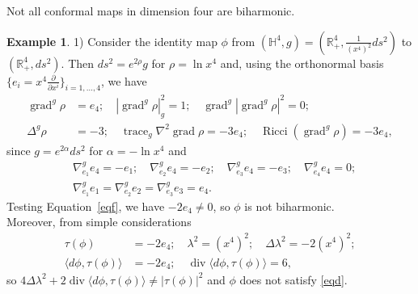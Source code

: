 \documentclass[12pt]{amsart}
\theoremstyle{plain}
\theoremstyle{definition}
\newtheorem{ex}{Example}
\begin{document}
Not all conformal maps in dimension four are biharmonic.
\begin{ex}
1) Consider the identity map $\phi$ from $({{\mathbb H}}^4 , g)=
({{\mathbb R}}_{+}^{4},\tfrac{1}{(x^4)^2}ds^2)$ to $({{\mathbb R}}^{4}_{+},ds^2)$. Then $ds^2 = e^{2\rho} g$
for $\rho = \ln x^4$ and, using the orthonormal basis $\{e_{i} = x^4
\tfrac{\partial}{\partial x^i}\}_{i=1,\dots,4}$, we have
\begin{align*}
\operatorname{grad}^g \rho &= e_4 ; \quad |\operatorname{grad}^g \rho|_{g}^2 = 1 ; \quad \operatorname{grad}^g|\operatorname{grad}^g \rho|^2 = 0 ;\\
\Delta^g \rho & = -3 ; \quad \operatorname{trace}_{g} \nabla^2 \operatorname{grad} \rho = -3 e_{4}; \quad \operatorname{Ricci}(\operatorname{grad}^g \rho)  = -3 e_4,
\end{align*}
since $g= e^{2\alpha} ds^2$ for $\alpha = - \ln x^4$ and
\begin{align*}
&\nabla^{g}_{e_{1}} e_{4} = - e_{1} ; \quad \nabla^{g}_{e_{2}} e_{4} = - e_{2} ;\quad
\nabla^{g}_{e_{3}} e_{4} = - e_{3} ; \quad \nabla^{g}_{e_{4}} e_{4} = 0 ; \\
&\nabla^{g}_{e_{1}} e_{1} =  \nabla^{g}_{e_{2}} e_{2} = \nabla^{g}_{e_{3}} e_{3} =
e_{4}.
\end{align*}
Testing Equation~\eqref{eqf}, we have $-2 e_{4} \neq 0$, so $\phi$ is not biharmonic.\\
Moreover, from simple considerations
\begin{align*}
\tau(\phi) &= -2e_{4} ; \quad  \lambda^2 = (x^4)^2 ; \quad \Delta \lambda^2 = -2 (x^4)^2 ; \\
\langle d\phi , \tau(\phi) \rangle &= -2 e_{4} ; \quad \operatorname{div} \langle d\phi , \tau(\phi)
\rangle = 6 ,
\end{align*}
so $4\Delta\lambda^2 + 2 \operatorname{div} \langle d\phi , \tau(\phi) \rangle \neq |\tau(\phi)|^2$ and $\phi$ does not satisfy \eqref{eqd}.\\


\end{ex}
\end{document}
